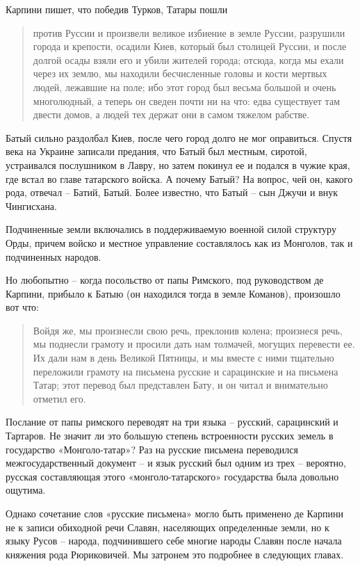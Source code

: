 Карпини пишет, что победив Турков, Татары пошли 

\begin{quotation}
против Руссии и произвели великое избиение в земле Руссии, разрушили города и крепости, осадили Киев, который был столицей Руссии, и после долгой осады взяли его и убили жителей города; отсюда, когда мы ехали через их землю, мы находили бесчисленные головы и кости мертвых людей, лежавшие на поле; ибо этот город был весьма большой и очень многолюдный, а теперь он сведен почти ни на что: едва существует там двести домов, а людей тех держат они в самом тяжелом рабстве.
\end{quotation}

Батый сильно раздолбал Киев, после чего город долго не мог оправиться. Спустя века на Украине записали предания, что Батый был местным, сиротой, устраивался послушником в Лавру, но затем покинул ее и подался в чужие края, где встал во главе татарского войска. А почему Батый? На вопрос, чей он, какого рода, отвечал – Батий, Батый. Более известно, что Батый – сын Джучи и внук Чингисхана.

Подчиненные земли включались в поддерживаемую военной силой структуру Орды, причем войско и местное управление составлялось как из Монголов, так и подчиненных народов.

Но любопытно – когда посольство от папы Римского, под руководством де Карпини, прибыло к Батыю (он находился тогда в земле Команов), произошло вот что:

\begin{quotation}
Войдя же, мы произнесли свою речь, преклонив колена; произнеся речь, мы поднесли грамоту и просили дать нам толмачей, могущих перевести ее. Их дали нам в день Великой Пятницы, и мы вместе с ними тщательно переложили грамоту на письмена русские и сарацинские и на письмена Татар; этот перевод был представлен Бату, и он читал и внимательно отметил его.
\end{quotation}

Послание от папы римского переводят на три языка – русский, сарацинский и Тартаров. Не значит ли это большую степень встроенности русских земель в государство «Монголо-татар»? Раз на русские письмена переводился межгосударственный документ – и язык русский был одним из трех – вероятно, русская составляющая этого «монголо-татарского» государства была довольно ощутима.

Однако сочетание слов «русские письмена» могло быть применено де Карпини не к записи обиходной речи Славян, населяющих определенные земли, но к языку Русов – народа, подчинившего себе многие народы Славян после начала княжения рода Рюриковичей. Мы затронем это подробнее в следующих главах. 

